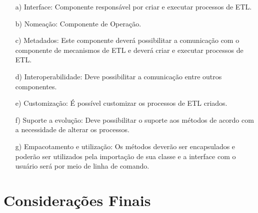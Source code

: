 \begin{itemize}
	\item[a)] Interface: Componente responsável por criar e executar processos de ETL.
	
	\item[b)] Nomeação: Componente de Operação.
	
	\item[c)] Metadados: Este componente deverá possibilitar a comunicação com o componente de mecanismos de ETL e deverá criar e executar processos de ETL.
	
	\item[d)] Interoperabilidade: Deve possibilitar a comunicação entre outros componentes.
	
	
	
	\item[e)] Customização: É possível customizar os processos de ETL criados.
	
	\item[f)] Suporte a evolução: Deve possibilitar o suporte aos métodos de acordo com a necessidade de alterar os processos.
	
	\item[g)] Empacotamento e utilização: Os métodos deverão ser encapsulados e poderão ser utilizados pela importação de sua classe e a interface com o usuário será por meio de linha de comando.
	
\end{itemize}

\section{Considerações Finais}
